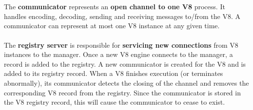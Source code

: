 \documentclass{l4proj}
\begin{document}
\\\\
\hspace*{1em} The \textbf{communicator} represents an \textbf{open channel to one V8} process. It handles encoding, decoding, sending and receiving messages to/from the V8. A communicator can represent at most one V8 instance at any given time.
\\\\
\hspace*{1em} The \textbf{registry server} is responsible for \textbf{servicing new connections} from V8 instances to the manager. Once a new V8 engine connects to the manager, a record is added to the registry. A new communicator is created for the V8 and is added to its registry record. When a V8 finishes execution (or terminates abnormally), its communicator detects the closing of the channel and removes the corresponding V8 record from the registry. Since the communicator is stored in the V8 registry record, this will cause the communicator to cease to exist. 
\end{document}
